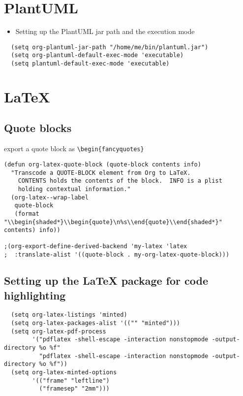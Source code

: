 \documentclass[11pt]{article}
\begin{document}
\section{PlantUML}
\label{sec:org5d9e1d0}

\begin{itemize}
\item Setting up the PlantUML jar path and the execution mode
\end{itemize}
\begin{verbatim}
  (setq org-plantuml-jar-path "/home/me/bin/plantuml.jar")
  (setq org-plantuml-default-exec-mode 'executable)
  (setq plantuml-default-exec-mode 'executable)
\end{verbatim}
\section{\LaTeX{}}
\label{sec:org82af178}

\subsection{Quote blocks}
\label{sec:orgb2169b1}

export a quote block as \texttt{\textbackslash{}begin\{fancyquotes\}}

\begin{verbatim}
(defun org-latex-quote-block (quote-block contents info)
  "Transcode a QUOTE-BLOCK element from Org to LaTeX.
    CONTENTS holds the contents of the block.  INFO is a plist
    holding contextual information."
  (org-latex--wrap-label
   quote-block
   (format "\\begin{shaded*}\\begin{quote}\n%s\\end{quote}\\end{shaded*}" contents) info))

;(org-export-define-derived-backend 'my-latex 'latex
;  :translate-alist '((quote-block . my-org-latex-quote-block)))
\end{verbatim}
\subsection{Setting up the \LaTeX{} package for code highlighting}
\label{sec:orgaa4d809}
\begin{verbatim}
  (setq org-latex-listings 'minted)
  (setq org-latex-packages-alist '(("" "minted")))
  (setq org-latex-pdf-process
        '("pdflatex -shell-escape -interaction nonstopmode -output-directory %o %f"
          "pdflatex -shell-escape -interaction nonstopmode -output-directory %o %f"))
  (setq org-latex-minted-options
        '(("frame" "leftline")
          ("framesep" "2mm")))
\end{verbatim}
\end{document}
